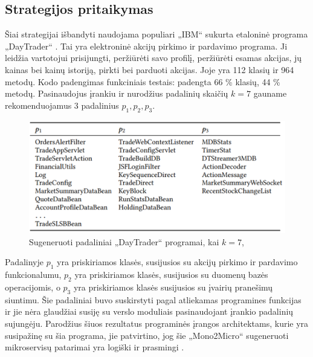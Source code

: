\documentclass{VUMIFPSbakalaurinis}
\begin{document}
\subsection{Strategijos pritaikymas}
Šiai strategijai išbandyti naudojama populiari „IBM“ sukurta etaloninė programa „DayTrader“ \cite{IBM15}. Tai yra elektroninė akcijų pirkimo ir pardavimo programa. Ji leidžia vartotojui prisijungti, peržiūrėti savo profilį, peržiūrėti esamas akcijas, jų kainas bei kainų istoriją, pirkti bei parduoti akcijas. Joje yra 112 klasių ir 964 metodų. Kodo padengimas funkciniais testais: padengta  66 \% klasių, 44 \% metodų. Pasinaudojus įrankiu ir nurodžius padalinių skaičių $k = 7$ gauname rekomenduojamus 3 padalinius $p_{1}, p_{2}, p_{3}$.

\begin{figure}[H]
    \centering
    \includegraphics{img/mono-micro-padaliniai.png}
    \caption{Sugeneruoti padaliniai „DayTrader“ programai, kai $k = 7$, \cite{KXK+21}}
    \label{img:mono-micro-padaliniai}
\end{figure}

Padalinyje $p_{1}$ yra priskiriamos klasės, susijusios su akcijų pirkimo ir pardavimo funkcionalumu, $p_{2}$ yra priskiriamos klasės, susijusios su duomenų bazės operacijomis, o $p_{3}$ yra priskiriamos klasės susijusios su įvairių pranešimų siuntimu. Šie padaliniai buvo suskirstyti pagal atliekamas programines funkcijas ir jie nėra glaudžiai susiję su verslo moduliais pasinaudojant įrankio padalinių sujungėju. Parodžius šiuos rezultatus programinės įrangos architektams, kurie yra susipažinę su šia programa, jie patvirtino, jog šie „Mono2Micro“ sugeneruoti mikroservisų patarimai yra logiški ir prasmingi \cite{KXL+20}.\\
\end{document}
